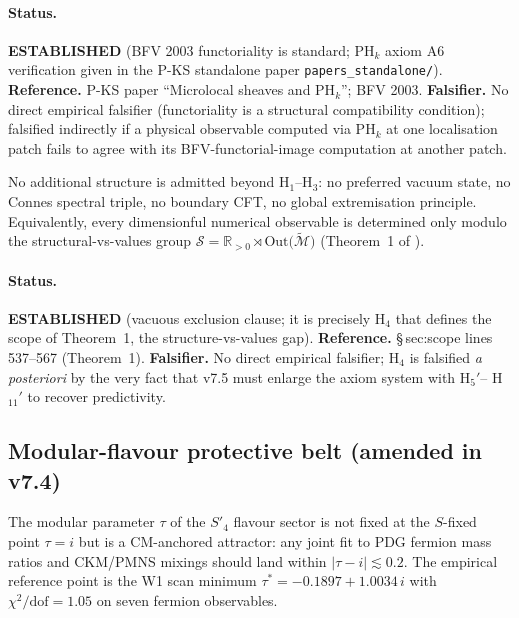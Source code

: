 \paragraph{Status.}  \textbf{ESTABLISHED} (BFV 2003 functoriality is
standard; PH$_k$ axiom A6 verification given in the P-KS standalone
paper \texttt{papers\_standalone/}).  \textbf{Reference.}  P-KS paper
``Microlocal sheaves and PH$_k$''; BFV 2003.  \textbf{Falsifier.}  No
direct empirical falsifier (functoriality is a structural compatibility
condition); falsified indirectly if a physical observable computed via
PH$_k$ at one localisation patch fails to agree with its
BFV-functorial-image computation at another patch.

\begin{axiom*}
No additional structure is admitted beyond H$_1$--H$_3$: no preferred
vacuum state, no Connes spectral triple, no boundary CFT, no global
extremisation principle.  Equivalently, every dimensionful numerical
observable is determined only modulo the structural-vs-values group
$\mathcal{S} = \mathbb{R}_{>0} \rtimes \mathrm{Out}\bigl(\widetilde
{\mathcal{M}}\bigr)$ (Theorem~1 of \cite{eci.tex}).
\end{axiom*}

\paragraph{Status.}  \textbf{ESTABLISHED} (vacuous exclusion clause; it
is precisely H$_4$ that defines the scope of Theorem~1, the
structure-vs-values gap).  \textbf{Reference.}  \cite{eci.tex}
\S\,sec:scope lines 537--567 (Theorem~1).  \textbf{Falsifier.}  No
direct empirical falsifier; H$_4$ is falsified \emph{a posteriori} by
the very fact that v7.5 must enlarge the axiom system with H$_5'$--%
H$_{11}'$ to recover predictivity.

\subsection{Modular-flavour protective belt (amended in v7.4)}
\label{sec:axioms-flavour}

\begin{axiom*}
The modular parameter $\tau$ of the $S'_4$ flavour sector is not fixed
at the $S$-fixed point $\tau = i$ but is a CM-anchored attractor: any
joint fit to PDG fermion mass ratios and CKM/PMNS mixings should land
within $|\tau - i| \lesssim 0.2$.  The empirical reference point is the
W1 scan minimum $\tau^{*} = -0.1897 + 1.0034\,i$ with
$\chi^{2}/\mathrm{dof} = 1.05$ on seven fermion observables.
\end{axiom*}

